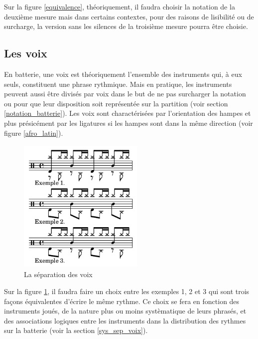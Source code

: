 Sur la figure \ref{equivalence}, théoriquement, il faudra choisir la notation
de la deuxième mesure mais dans certains contextes, pour des raisons de
lisibilité ou de surcharge, la version sans les silences de la troisième mesure
pourra être choisie.

\subsection*{Les voix}


En batterie, une voix est théoriquement l’ensemble des instruments qui, à eux
seuls, constituent une phrase rythmique. Mais en pratique, les instruments
peuvent aussi être divisés par voix dans le but de ne pas surcharger la
notation ou pour que leur disposition soit représentée sur la
partition (voir section \ref{notation_batterie}).
Les voix sont charactérisées par l’orientation des hampes et plus présicément
par les ligatures si les hampes sont dans la même direction (voir figure
\ref{afro_latin}).

\begin{figure}[h]
	\centering
	\includegraphics[height=65mm, width=60mm]{
    z_images/3_methodes/0_notation_de_la_batterie/7_voix.png}
	\caption{La séparation des voix}
	\label{sep_voix}
\end{figure}
Sur la figure \ref{sep_voix}, il faudra faire un choix entre les exemples 1, 2
et 3 qui sont trois façons équivalentes d’écrire le même rythme.
Ce choix se fera en fonction des instruments joués, de la nature plus ou moins
systèmatique de leurs phrasés, et des associations logiques entre les
instruments dans la distribution des rythmes sur la batterie (voir la section
\ref{sys_sep_voix}).

